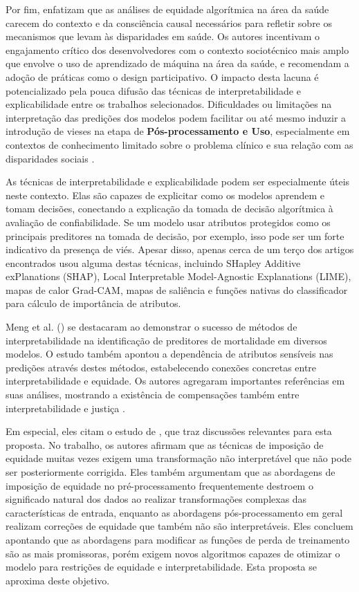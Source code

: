Por fim, \citet{pfohl2021empirical} enfatizam que as análises de equidade algorítmica na área da saúde carecem do contexto e da consciência causal necessários para refletir sobre os mecanismos que levam às disparidades em saúde. Os autores incentivam o engajamento crítico dos desenvolvedores com o contexto sociotécnico mais amplo que envolve o uso de aprendizado de máquina na área da saúde, e recomendam a adoção de práticas como o design participativo. O impacto desta lacuna é potencializado pela pouca difusão das técnicas de interpretabilidade e explicabilidade entre os trabalhos selecionados. Dificuldades ou limitações na interpretação das predições dos modelos podem facilitar ou até mesmo induzir a introdução de vieses na etapa de \textbf{Pós-processamento e Uso}, especialmente em contextos de conhecimento limitado sobre o problema clínico e sua relação com as disparidades sociais \cite{chandak2020using}.

As técnicas de interpretabilidade e explicabilidade podem ser especialmente úteis neste contexto. Elas são capazes de explicitar como os modelos aprendem e tomam decisões,  conectando a explicação da tomada de decisão algorítmica à avaliação de confiabilidade. Se um modelo usar atributos protegidos como os principais preditores na tomada de decisão, por exemplo, isso pode ser um forte indicativo da presença de viés. Apesar disso, apenas cerca de um terço dos artigos encontrados usou alguma destas técnicas, incluindo SHapley Additive exPlanations (SHAP), Local Interpretable Model-Agnostic Explanations (LIME), mapas de calor Grad-CAM, mapas de saliência e funções nativas do classificador para cálculo de importância de atributos.

Meng et al. (\citeyear{meng2022interpretability}) se destacaram ao demonstrar o sucesso de métodos de interpretabilidade na identificação de preditores de mortalidade em diversos modelos. O estudo também apontou a dependência de atributos sensíveis nas predições através destes métodos, estabelecendo conexões concretas entre interpretabilidade e equidade. Os autores agregaram importantes referências em suas análises, mostrando a existência de compensações também entre interpretabilidade e justiça \cite{jabbari2020empirical}.

Em especial, eles citam o estudo de \citet{wang2020pursuit}, que traz discussões relevantes para esta proposta. No trabalho, os autores afirmam que as técnicas de imposição de equidade muitas vezes exigem uma transformação não interpretável que não pode ser posteriormente corrigida. Eles também argumentam que as abordagens de imposição de equidade no pré-processamento frequentemente destroem o significado natural dos dados ao realizar transformações complexas das características de entrada, enquanto as abordagens pós-processamento em geral realizam correções de equidade que também não são interpretáveis. Eles concluem apontando que as abordagens para modificar as funções de perda de treinamento são as mais promissoras, porém exigem novos algoritmos capazes de otimizar o modelo para restrições de equidade e interpretabilidade. Esta proposta se aproxima deste objetivo.

